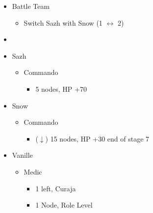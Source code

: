 \begin{menu}
		\begin{itemize}
			\paradigm
			\begin{itemize}
				\item Battle Team
				      \begin{itemize}
					      \item Switch Sazh with Snow (1 $\leftrightarrow$ 2)
				      \end{itemize}
				\item {}%
				      {\paradigmline{(\rav)}{\com}{\com}}%
				      {\paradigmline[2]{\textit{\com}}{\textit{\com}}{\textit{\com}}}%
				      {\paradigmline{(\rav)}{\sen}{(\rav)}}%
				      {\paradigmline{(\com)}{(\com)}{\med}}%
				      {\paradigmline{\rav}{(\com)}{(\rav)}}%
				      {\paradigmline{\rav}{\rav}{\rav}}
			\end{itemize}
			\crystarium
			\begin{itemize}
				\item Sazh
				      \begin{itemize}
					      \item Commando
					            \begin{itemize}
						            \item 5 nodes, HP +70
					            \end{itemize}
				      \end{itemize}
				\item Snow
				      \begin{itemize}
					      \item Commando
					            \begin{itemize}
						            \item ($\downarrow$) 15 nodes, HP +30 end of stage 7
					            \end{itemize}
				      \end{itemize}
				\item Vanille
				      \begin{itemize}
					      \item Medic
					            \begin{itemize}
						            \item 1 left, Curaja
						            \item 1 Node, Role Level
					            \end{itemize}
				      \end{itemize}
			\end{itemize}

\end{itemize}
\end{menu}
